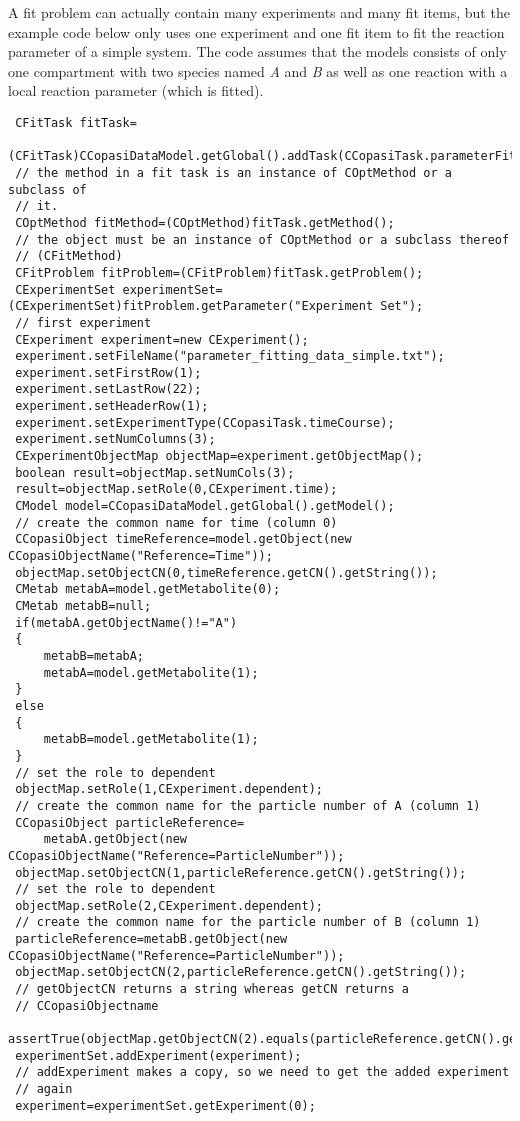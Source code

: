 \documentclass[a4,10pt]{article}
\begin{document}
A fit problem can actually contain many experiments and many fit items, but the example code below only uses one experiment and one fit item to fit the reaction parameter of a simple system. The code assumes that the models consists of only one compartment with two species named \textit{A} and \textit{B} as well as one reaction with a local reaction parameter (which is fitted).

\begin{lstlisting}
 CFitTask fitTask=
   (CFitTask)CCopasiDataModel.getGlobal().addTask(CCopasiTask.parameterFitting);
 // the method in a fit task is an instance of COptMethod or a subclass of
 // it.
 COptMethod fitMethod=(COptMethod)fitTask.getMethod();
 // the object must be an instance of COptMethod or a subclass thereof
 // (CFitMethod)
 CFitProblem fitProblem=(CFitProblem)fitTask.getProblem();
 CExperimentSet experimentSet=(CExperimentSet)fitProblem.getParameter("Experiment Set");
 // first experiment
 CExperiment experiment=new CExperiment();
 experiment.setFileName("parameter_fitting_data_simple.txt");
 experiment.setFirstRow(1);
 experiment.setLastRow(22);
 experiment.setHeaderRow(1);
 experiment.setExperimentType(CCopasiTask.timeCourse);
 experiment.setNumColumns(3);
 CExperimentObjectMap objectMap=experiment.getObjectMap();
 boolean result=objectMap.setNumCols(3);
 result=objectMap.setRole(0,CExperiment.time);
 CModel model=CCopasiDataModel.getGlobal().getModel();
 // create the common name for time (column 0)
 CCopasiObject timeReference=model.getObject(new CCopasiObjectName("Reference=Time"));
 objectMap.setObjectCN(0,timeReference.getCN().getString());
 CMetab metabA=model.getMetabolite(0);
 CMetab metabB=null;
 if(metabA.getObjectName()!="A")
 {
     metabB=metabA;
     metabA=model.getMetabolite(1);
 }
 else
 {
     metabB=model.getMetabolite(1);
 }
 // set the role to dependent
 objectMap.setRole(1,CExperiment.dependent);
 // create the common name for the particle number of A (column 1)
 CCopasiObject particleReference=
     metabA.getObject(new CCopasiObjectName("Reference=ParticleNumber"));
 objectMap.setObjectCN(1,particleReference.getCN().getString());
 // set the role to dependent
 objectMap.setRole(2,CExperiment.dependent);
 // create the common name for the particle number of B (column 1)
 particleReference=metabB.getObject(new CCopasiObjectName("Reference=ParticleNumber"));
 objectMap.setObjectCN(2,particleReference.getCN().getString());
 // getObjectCN returns a string whereas getCN returns a
 // CCopasiObjectname
 assertTrue(objectMap.getObjectCN(2).equals(particleReference.getCN().getString()));
 experimentSet.addExperiment(experiment);
 // addExperiment makes a copy, so we need to get the added experiment
 // again
 experiment=experimentSet.getExperiment(0);


\end{lstlisting}
\end{document}
